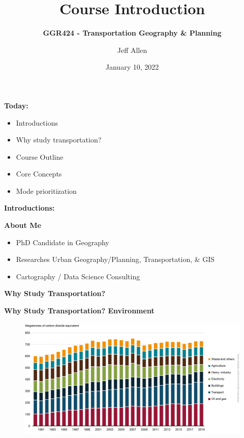 \documentclass[aspectratio=169]{beamer}
\title{\textbf{Course Introduction}}
\subtitle{\textbf{GGR424 - Transportation Geography \& Planning}}
\author{Jeff Allen}
\institute{University of Toronto}
\date{January 10, 2022}
\begin{document}
	
\begin{frame}
	\titlepage	
\end{frame}



\begin{frame}
\textbf{Today:}
\begin{itemize}
	\item Introductions
	\item Why study transportation?
	\item Course Outline
	\item Core Concepts
	\item Mode prioritization
\end{itemize}
\end{frame}




\begin{frame}
\LARGE{\textbf{Introductions:}}
\end{frame}

\begin{frame}
\textbf{About Me}
\begin{itemize}
	\item PhD Candidate in Geography
	\item Researches Urban Geography/Planning, Transportation, \& GIS
	\item Cartography / Data Science Consulting
\end{itemize}
\end{frame}





\begin{frame}
	\LARGE{\textbf{Why Study Transportation?}}
\end{frame}






\begin{frame}
	\textbf{Why Study Transportation? Environment}
	\begin{figure}
		\centering
		\includegraphics[width=0.8\linewidth]{images/canada_emissions_by_sector.png}
	\end{figure}
\end{frame}
\end{document}
